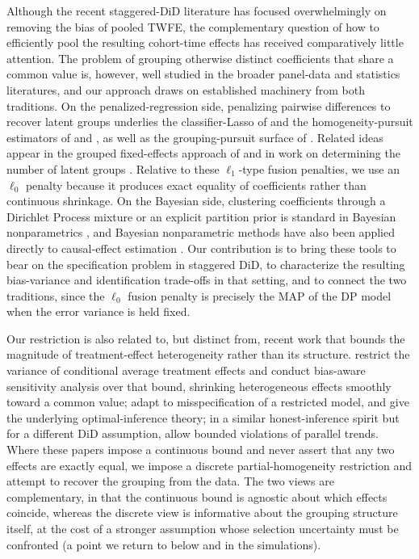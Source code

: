 \documentclass[margin=5in, 12pt]{article}
\newcommand{\1}{\mathbbm{1}}
\begin{document}
Although the recent staggered-DiD literature has focused overwhelmingly on removing the bias of pooled TWFE, the complementary question of how to efficiently pool the resulting cohort-time effects has received comparatively little attention. The problem of grouping otherwise distinct coefficients that share a common value is, however, well studied in the broader panel-data and statistics literatures, and our approach draws on established machinery from both traditions. On the penalized-regression side, penalizing pairwise differences to recover latent groups underlies the classifier-Lasso of \citet{su2016} and the homogeneity-pursuit estimators of \citet{ke2015} and \citet{wang2018}, as well as the grouping-pursuit surface of \citet{shen2010}. Related ideas appear in the grouped fixed-effects approach of \citet{bonhomme2015} and in work on determining the number of latent groups \citep{lu2017}. Relative to these $\ell_1$-type fusion penalties, we use an $\ell_0$ penalty because it produces exact equality of coefficients rather than continuous shrinkage. On the Bayesian side, clustering coefficients through a Dirichlet Process mixture or an explicit partition prior is standard in Bayesian nonparametrics \citep{ferguson1973, antoniak1974, hartigan1990, barry1992}, and Bayesian nonparametric methods have also been applied directly to causal-effect estimation \citep{hill2011}. Our contribution is to bring these tools to bear on the specification problem in staggered DiD, to characterize the resulting bias-variance and identification trade-offs in that setting, and to connect the two traditions, since the $\ell_0$ fusion penalty is precisely the MAP of the DP model when the error variance is held fixed.

Our restriction is also related to, but distinct from, recent work that bounds the magnitude of treatment-effect heterogeneity rather than its structure. \citet{kwon2026} restrict the variance of conditional average treatment effects and conduct bias-aware sensitivity analysis over that bound, shrinking heterogeneous effects smoothly toward a common value; \citet{armstrong2025} adapt to misspecification of a restricted model, and \citet{armstrong2018} give the underlying optimal-inference theory; in a similar honest-inference spirit but for a different DiD assumption, \citet{rambachan2023} allow bounded violations of parallel trends. Where these papers impose a continuous bound and never assert that any two effects are exactly equal, we impose a discrete partial-homogeneity restriction and attempt to recover the grouping from the data. The two views are complementary, in that the continuous bound is agnostic about which effects coincide, whereas the discrete view is informative about the grouping structure itself, at the cost of a stronger assumption whose selection uncertainty must be confronted (a point we return to below and in the simulations).
\end{document}
